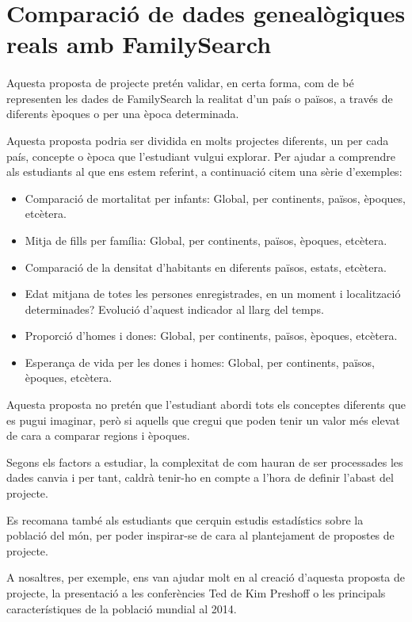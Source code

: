 \section{Comparació de dades genealògiques reals amb Family\-Search}

    \paragraph{}
    Aquesta proposta de projecte pretén validar, en certa forma, com de bé representen les dades de FamilySearch la realitat d'un país o països, a través de diferents èpoques o per una època determinada.

    Aquesta proposta podria ser dividida en molts projectes diferents, un per cada país, concepte o època que l'estudiant vulgui explorar. Per ajudar a comprendre als estudiants al que ens estem referint, a continuació citem una sèrie d'exemples:

    \begin{itemize}
        \item Comparació de mortalitat per infants: Global, per continents, països, èpoques, etcètera.
        \item Mitja de fills per família: Global, per continents, països, èpoques, etcètera.
        \item Comparació de la densitat d'habitants en diferents països, estats, etcètera.
        \item Edat mitjana de totes les persones enregistrades, en un moment i localització determinades? Evolució d'aquest indicador al llarg del temps.
        \item Proporció d'homes i dones: Global, per continents, països, èpoques, etcètera.
        \item Esperança de vida per les dones i homes: Global, per continents, països, èpoques, etcètera.
    \end{itemize}

    Aquesta proposta no pretén que l'estudiant abordi tots els conceptes diferents que es pugui imaginar, però si aquells que cregui que poden tenir un valor més elevat de cara a comparar regions i èpoques.

    Segons els factors a estudiar, la complexitat de com hauran de ser processades les dades canvia i per tant, caldrà tenir-ho en compte a l'hora de definir l'abast del projecte.

    Es recomana també als estudiants que cerquin estudis estadístics sobre la població del món, per poder inspirar-se de cara al plantejament de propostes de projecte.

    A nosaltres, per exemple, ens van ajudar molt en al creació d'aquesta proposta de projecte, la presentació a les conferències Ted de Kim Preshoff o les principals característiques de la població mundial al 2014.
